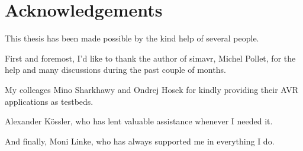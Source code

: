\chapter{Acknowledgements} \label{chapter:acknowledgements}

This thesis has been made possible by the kind help of several people.

First and foremost, I'd like to thank the author of simavr, Michel Pollet, for
the help and many discussions during the past couple of months.

My colleages Mino Sharkhawy and Ondrej Hosek for kindly providing their AVR
applications as testbeds.

Alexander K\"ossler, who has lent valuable assistance whenever I needed it.

And finally, Moni Linke, who has always supported me in everything I do.